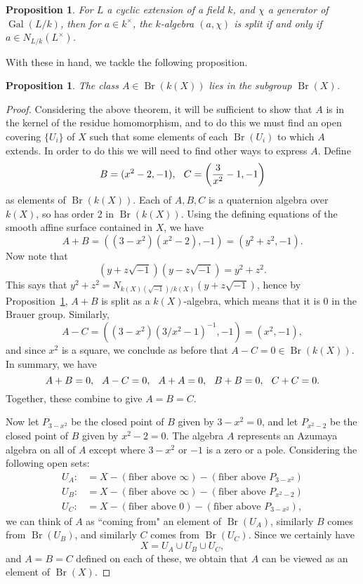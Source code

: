 \documentclass[12pt,twoside]{reedthesis}
\theoremstyle{plain}
\newtheorem{proposition}[theorem]{Proposition}
\theoremstyle{definition}
\theoremstyle{remark}
\newcommand{\Br}{\operatorname{Br}}
\newcommand{\Gal}{\operatorname{Gal}}
\begin{document}
\begin{proposition}\label{splitting}
For $L$ a cyclic extension of a field $k$, and $\chi$ a generator of $\Gal(L/k)$, then for $a\in k^\times$, the $k$-algebra $(a,\chi)$ is split if and only if $a\in N_{L/k}(L^\times)$.
\end{proposition}
\noindent With these in hand, we tackle the following proposition.
\begin{proposition}
The class $A\in\Br(k(X))$ lies in the subgroup $\Br(X)$.
\end{proposition}
\begin{proof}
Considering the above theorem, it will be sufficient to show that $A$ is in the kernel of the residue homomorphism, and to do this we must find an open covering $\{U_i\}$ of $X$ such that some elements of each $\Br(U_i)$ to which $A$ extends. In order to do this we will need to find other ways to express $A$. Define 
\[
B=(x^2-2,-1),\hspace{0.25cm} C=\left(\frac{3}{x^2}-1,-1\right)
\]
as elements of $\Br(k(X))$. Each of $A,B,C$ is a quaternion algebra over $k(X)$, so has order 2 in $\Br(k(X))$. Using the defining equations of the smooth affine surface contained in $X$, we have
\[
A+B=((3-x^2)(x^2-2),-1)=(y^2+z^2,-1).
\]
Now note that
\[
(y+z\sqrt{-1})(y-z\sqrt{-1})=y^2+z^2.
\]
This says that $y^2+z^2=N_{k(X)(\sqrt{-1})/k(X)}(y+z\sqrt{-1})$, hence by Proposition~\ref{splitting}, $A+B$ is split as a $k(X)$-algebra, which means that it is 0 in the Brauer group. Similarly,
\[
A-C=((3-x^2)(3/x^2-1)^{-1},-1)=(x^2,-1),
\]
and since $x^2$ is a square, we conclude as before that $A-C=0\in\Br(k(X)).$ In summary, we have
\[
A+B=0,\hspace{0.25cm} A-C=0,\hspace{0.25cm} A+A=0,\hspace{0.25cm} B+B=0,\hspace{0.25cm} C+C=0.
\]
Together, these combine to give $A=B=C$. 

Now let $P_{3-x^2}$ be the closed point of $B$ given by $3-x^2=0$, and let $P_{x^2-2}$ be the closed point of $B$ given by $x^2-2=0$. The algebra $A$ represents an Azumaya algebra on all of $A$ except where $3-x^2$ or $-1$ is a zero or a pole. Considering the following open sets:
\begin{align*}
U_A:&=X-(\text{fiber above $\infty$})-(\text{fiber above $P_{3-x^2}$})\\
U_B:&=X-(\text{fiber above $\infty$})-(\text{fiber above $P_{x^2-2}$})\\
U_C:&=X-(\text{fiber above $0$})-(\text{fiber above $P_{3-x^2}$}),
\end{align*}
we can think of $A$ as ``coming from" an element of $\Br(U_A)$, similarly $B$ comes from $\Br(U_B)$, and similarly $C$ comes from $\Br(U_C)$. Since we certainly have \[X=U_A\cup U_B\cup U_C,\] and $A=B=C$ defined on each of these, we obtain that $A$ can be viewed as an element of $\Br(X)$.
\end{proof}
\end{document}
